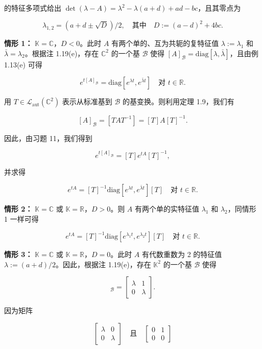 \begin{remark}
\begin{items}
的特征多项式给出 $ \det(\lambda - A) = \lambda^{2} - \lambda(a + d) + ad - bc $，且其零点为

\[
\lambda_{1,2} = \left( a + d \pm \sqrt{D} \right)/2 , \quad \text{其中} \quad D := (a - d)^{2} + 4bc .
\]

\textbf{情形 1：} $ \mathbb{K} = \mathbb{C} $，$ D < 0 $。此时 $ A $ 有两个单的、互为共轭的复特征值 $ \lambda := \lambda_{1} $ 和 $ \bar{\lambda} = \lambda_{2} $。根据注 1.19(e)，存在 $ \mathbb{C}^{2} $ 的一个基 $ \mathcal{B} $ 使得 $ [A]_{\mathcal{B}} = \mathrm{diag}[\lambda,\bar{\lambda}] $，且由例 1.13(e) 可得

\[
e^{t[A]_{\mathcal{B}}} = \mathrm{diag}[e^{\lambda t}, e^{\bar{\lambda} t}] \quad \text{对 } t \in \mathbb{R} .
\]

用 $ T \in \mathcal{L}_{\mathrm{aut}}(\mathbb{C}^{2}) $ 表示从标准基到 $ \mathcal{B} $ 的基变换。则利用定理 1.9，我们有

\[
[A]_{\mathcal{B}} = [TAT^{-1}] = [T]A[T]^{-1} .
\]

因此，由习题 11，我们得到

\[
e^{t[A]_{\mathcal{B}}} = [T]e^{tA}[T]^{-1} ,
\]

并求得

\[
e^{tA} = [T]^{-1}\mathrm{diag}[e^{\lambda t}, e^{\bar{\lambda} t}][T] \quad \text{对 } t \in \mathbb{R} .
\]

\textbf{情形 2：} $ \mathbb{K} = \mathbb{C} $ 或 $ \mathbb{K} = \mathbb{R} $，$ D > 0 $。则 $ A $ 有两个单的实特征值 $ \lambda_{1} $ 和 $ \lambda_{2} $，同情形 1 一样可得

\[
e^{tA} = [T]^{-1}\mathrm{diag}[e^{\lambda_{1}t}, e^{\lambda_{2}t}][T] \quad \text{对 } t \in \mathbb{R} .
\]

\textbf{情形 3：} $ \mathbb{K} = \mathbb{C} $ 或 $ \mathbb{K} = \mathbb{R} $，$ D = 0 $。此时 $ A $ 有代数重数为 2 的特征值 $ \lambda := (a + d)/2 $。因此，根据注 1.19(e)，存在 $ \mathbb{K}^{2} $ 的一个基 $ \mathcal{B} $ 使得

\begin{equation*}
[A]_{\mathcal{B}} = \begin{bmatrix} \lambda & 1 \\ 0 & \lambda \end{bmatrix} .
\end{equation*}

因为矩阵

\begin{equation*}
\begin{bmatrix} \lambda & 0 \\ 0 & \lambda \end{bmatrix} \quad \text{且} \quad \begin{bmatrix} 0 & 1 \\ 0 & 0 \end{bmatrix}
\end{equation*}


\end{items}
\end{remark}
